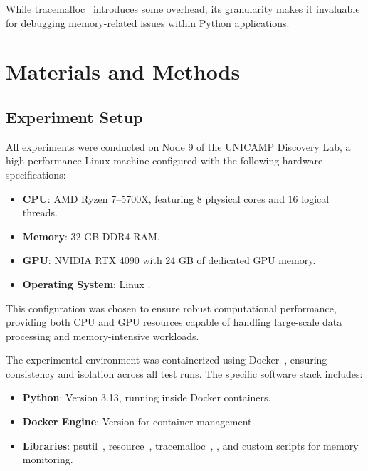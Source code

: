 While tracemalloc~\cite{tracemalloc} introduces some overhead, its granularity makes it invaluable for debugging memory-related issues within Python applications.


\section{Materials and Methods}
\label{sec:mmc-materials-methods}

\subsection{Experiment Setup}
\label{subsec:mmc-experiment-setup}

All experiments were conducted on Node 9 of the \ac{UNICAMP} Discovery Lab, a high-performance Linux machine configured with the following hardware specifications:

\begin{itemize}
    \item \textbf{CPU}:
    AMD Ryzen 7--5700X, featuring 8 physical cores and 16 logical threads.

    \item \textbf{Memory}:
    32 GB DDR4 RAM.

    \item \textbf{GPU}:
    NVIDIA RTX 4090 with 24 GB of dedicated GPU memory.

    \item \textbf{Operating System}:
    Linux .
\end{itemize}

This configuration was chosen to ensure robust computational performance, providing both CPU and GPU resources capable of handling large-scale data processing and memory-intensive workloads.

The experimental environment was containerized using Docker~\cite{docker}, ensuring consistency and isolation across all test runs.
The specific software stack includes:

\begin{itemize}
    \item \textbf{Python}:
    Version 3.13, running inside Docker containers.

    \item \textbf{Docker Engine}:
    Version  for container management.

    \item \textbf{Libraries}:
    psutil~\cite{psutil}, resource~\cite{importlib_resources}, tracemalloc~\cite{tracemalloc}, , and custom scripts for memory monitoring.
\end{itemize}

